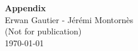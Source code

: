 \documentclass[11pt]{article}
\begin{document}






 \clearpage

 


\clearpage

\appendix
\renewcommand{\thesection}{\Alph{section}}

\setcounter{figure}{0}
\setcounter{table}{0}

\renewcommand{\thefigure}{\Alph{section}.\arabic{figure}}
\renewcommand{\thetable}{\Alph{section}.\arabic{table}}

 \setcounter{page}{1}
\begin{center}

{\textbf{\Large  Appendix     \\ }}\vspace{0.3cm}
\Large {Erwan Gautier - Jérémi Montornès} \\
\vspace{1cm}
{\Large(Not for publication)}\\
\vspace{1cm}
\today\\



\end{center}




\end{document}
